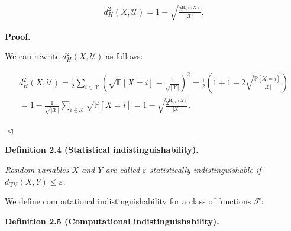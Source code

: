 \documentclass[10pt,a4paper]{article}
\begin{document}
\[\begin{gathered}
d_{H}^{2}\left(X,\mathcal{U}\right)=1-\sqrt{\frac{2^{\mathrm{H}_{1/2}\left(X\right)}}{|\mathcal{X}|}}.
\end{gathered}\]






\par\medskip\noindent\textbf{
\textbf{Proof}.}\par




We can rewrite $d_{H}^{2}\left(X,\mathcal{U}\right)$ as follows:\par


\[\begin{gathered}
\displaystyle d_{H}^{2}\left(X,\mathcal{U}\right) \displaystyle=\frac{1}{2}\sum_{i\in\mathcal{X}}\left(\sqrt{\mathbb{P}[X=i]}-\frac{1}{\sqrt{|\mathcal{X}|}}\right)^{2}=\frac{1}{2}\left(1+1-2\sqrt{\frac{\mathbb{P}[X=i]}{|\mathcal{X}|}}\right) \\
\displaystyle=1-\frac{1}{\sqrt{|\mathcal{X}|}}\sum_{i\in\mathcal{X}}\sqrt{\mathbb{P}[X=i]}=1-\sqrt{\frac{2^{\mathrm{H}_{1/2}\left(X\right)}}{|\mathcal{X}|}}.\
\end{gathered}\]


$\vartriangleleft$\par





\par\medskip\noindent\textbf{
\textbf{Definition 2.4}\textbf{ }(Statistical indistinguishability)\textbf{.}
}\par



\emph{Random variables $X$ and $Y$ are called $\varepsilon$-statistically indistinguishable if $d_{\mathrm{TV}}(X,Y)\leq\varepsilon$.}\par






We define computational indistinguishability for a class of functions $\mathcal{F}$:\par





\par\medskip\noindent\textbf{
\textbf{Definition 2.5}\textbf{ }(Computational indistinguishability)\textbf{.}
}\par
\end{document}
